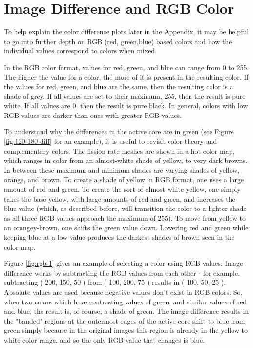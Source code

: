 
\label{app}

\section{Image Difference and RGB Color}
To help explain the color difference plots later in the Appendix, it may be helpful to go into further depth on RGB (red, green,blue) based colors and how the individual values correspond to colors when mixed.

In the RGB color format, values for red, green, and blue can range from 0 to 255.  The higher the value for a color, the more of it is present in the resulting color.  If the values for red, green, and blue are the same, then the resulting color is a shade of grey.  If all values are set to their maximum, 255, then the result is pure white.  If all values are 0, then the result is pure black.  In general, colors with low RGB values are darker than  ones with greater RGB values.

To understand why the differences in the active core are in green (see Figure \ref{fig:120-180-diff} for an example), it is useful to revisit color theory and complementary colors.  The fission rate meshes are shown in a hot color map, which ranges in color from an almost-white shade of yellow, to very dark browns.  In between these maximum and minimum shades are varying shades of yellow, orange, and brown.  To create a shade of yellow in RGB format, one uses a large amount of red and green.  To create the sort of almost-white yellow, one simply takes the base yellow, with large amounts of red and green, and increases the blue value (which, as described before, will transition the color to a lighter shade as all three RGB values approach the maximum of 255).  To move from yellow to an orangey-brown, one shifts the green value down.  Lowering red and green while keeping blue at a low value produces the darkest shades of brown seen in the color map.



Figure \ref{fig:rgb-1} gives an example of selecting a color using RGB values.  Image difference works by subtracting the RGB values from each other - for example, subtracting ( 200, 150, 50 ) from ( 100, 200, 75 ) results in ( 100, 50, 25 ).  Absolute values are used because negative values don't exist in RGB colors.  So, when  two colors which have contrasting values of green, and similar values of red and blue, the result is, of course, a shade of green.  The image difference results in the "banded" regions at the outermost edges of the active core shift to blue from green simply because in the original images this region is already in the yellow to white color range, and so the only RGB value that changes is blue.

